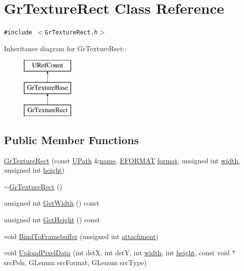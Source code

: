 \hypertarget{class_gr_texture_rect}{
\section{GrTextureRect Class Reference}
\label{class_gr_texture_rect}
}
{\tt \#include $<$GrTextureRect.h$>$}

Inheritance diagram for GrTextureRect::\begin{figure}[H]
\begin{center}
\leavevmode
\includegraphics[height=3cm]{class_gr_texture_rect}
\end{center}
\end{figure}
\subsection*{Public Member Functions}
\begin{CompactItemize}
\item 
\hyperlink{class_gr_texture_rect_d9e2adcc0e64b50e658eb43d80a00368}{GrTextureRect} (const \hyperlink{class_u_path}{UPath} \&\hyperlink{glext__bak_8h_bb62efe59ccdd153ce42e1a418352209}{name}, \hyperlink{class_gr_texture_base_82c606022e93566ba55fe4cd3beb687c}{EFORMAT} \hyperlink{glext__bak_8h_e2d3db041c6004a67047659b42f73a44}{format}, unsigned int \hyperlink{wglext_8h_e6531b1788ca42a9ae8155b0c52e7630}{width}, unsigned int \hyperlink{wglext_8h_b2e63df950c3789599e1e43f477bc9e3}{height})
\item 
\hyperlink{class_gr_texture_rect_cb5a5fe6cd3041f7c75a6ab5e624ad98}{$\sim$GrTextureRect} ()
\item 
unsigned int \hyperlink{class_gr_texture_rect_7e4df2f17a93340ba6bb98ab707dbe83}{GetWidth} () const 
\item 
unsigned int \hyperlink{class_gr_texture_rect_c6be29f7af211b67722dc48ffaa232df}{GetHeight} () const 
\item 
void \hyperlink{class_gr_texture_rect_a50c4865b823b882367fed497667f77b}{BindToFramebuffer} (unsigned int \hyperlink{glext__bak_8h_d8f97111cc6514af5f352219d1cceb40}{attachment})
\item 
void \hyperlink{class_gr_texture_rect_25477360df1bff07b870f655524d32fb}{UploadPixelData} (int dstX, int dstY, int \hyperlink{wglext_8h_e6531b1788ca42a9ae8155b0c52e7630}{width}, int \hyperlink{wglext_8h_b2e63df950c3789599e1e43f477bc9e3}{height}, const void $\ast$srcPels, GLenum srcFormat, GLenum srcType)
\end{CompactItemize}


